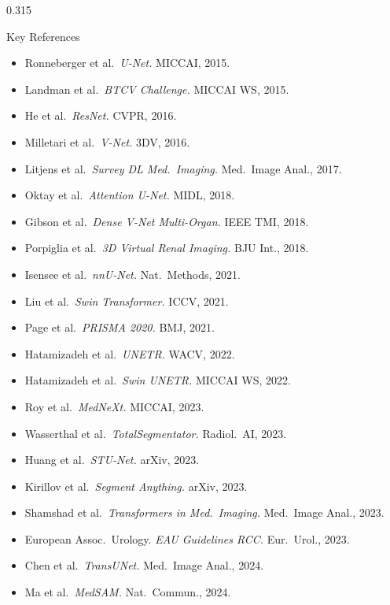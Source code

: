 \documentclass[final,t]{beamer}
\begin{document}
\begin{frame}[t]
\begin{columns}[t,totalwidth=\textwidth]
\begin{column}{0.315\textwidth}
\begin{pblock}{Key References}
{\small
\setlength{\leftmargini}{1em}
\begin{itemize}\setlength\itemsep{-2pt}\setlength\topsep{0pt}\setlength\parsep{0pt}
  \item Ronneberger et al.\ \emph{U-Net.} MICCAI, 2015.
  \item Landman et al.\ \emph{BTCV Challenge.} MICCAI WS, 2015.
  \item He et al.\ \emph{ResNet.} CVPR, 2016.
  \item Milletari et al.\ \emph{V-Net.} 3DV, 2016.
  \item Litjens et al.\ \emph{Survey DL Med.\ Imaging.} Med.\ Image Anal., 2017.
  \item Oktay et al.\ \emph{Attention U-Net.} MIDL, 2018.
  \item Gibson et al.\ \emph{Dense V-Net Multi-Organ.} IEEE TMI, 2018.
  \item Porpiglia et al.\ \emph{3D Virtual Renal Imaging.} BJU Int., 2018.
  \item Isensee et al.\ \emph{nnU-Net.} Nat.\ Methods, 2021.
  \item Liu et al.\ \emph{Swin Transformer.} ICCV, 2021.
  \item Page et al.\ \emph{PRISMA 2020.} BMJ, 2021.
  \item Hatamizadeh et al.\ \emph{UNETR.} WACV, 2022.
  \item Hatamizadeh et al.\ \emph{Swin UNETR.} MICCAI WS, 2022.
  \item Roy et al.\ \emph{MedNeXt.} MICCAI, 2023.
  \item Wasserthal et al.\ \emph{TotalSegmentator.} Radiol.\ AI, 2023.
  \item Huang et al.\ \emph{STU-Net.} arXiv, 2023.
  \item Kirillov et al.\ \emph{Segment Anything.} arXiv, 2023.
  \item Shamshad et al.\ \emph{Transformers in Med.\ Imaging.} Med.\ Image Anal., 2023.
  \item {European Assoc.\ Urology.} \emph{EAU Guidelines RCC.} Eur.\ Urol., 2023.
  \item Chen et al.\ \emph{TransUNet.} Med.\ Image Anal., 2024.
  \item Ma et al.\ \emph{MedSAM.} Nat.\ Commun., 2024.
\end{itemize}
}
\end{pblock}

\end{column}
\end{columns}
\end{frame}
\end{document}
